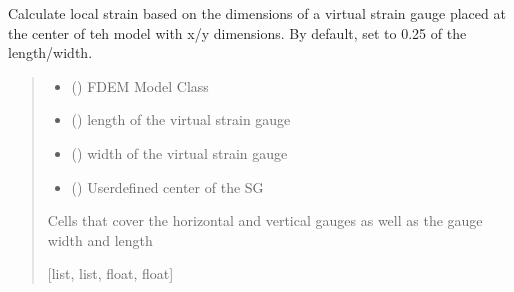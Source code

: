 \documentclass[letterpaper,10pt,english]{sphinxmanual}
\begin{document}
\begin{fulllineitems}
\label{\detokenize{pyfdempp:pyfdempp.complete_UCS_thread_pool_generators.set_strain_gauge}}
\pysigstartsignatures
{}
\pysigstopsignatures
\sphinxAtStartPar
Calculate local strain based on the dimensions of a virtual strain gauge placed at the center of teh model with
x/y dimensions. By default, set to 0.25 of the length/width.
\begin{quote}\begin{description}
\begin{itemize}
\item {} 
\sphinxAtStartPar
{} () \textendash{} FDEM Model Class

\item {} 
\sphinxAtStartPar
{} () \textendash{} length of the virtual strain gauge

\item {} 
\sphinxAtStartPar
{} () \textendash{} width of the virtual strain gauge

\item {} 
\sphinxAtStartPar
{} (\sphinxstyleliteralemphasis{\sphinxupquote{{[}}}\sphinxstyleliteralemphasis{\sphinxupquote{, }}\sphinxstyleliteralemphasis{\sphinxupquote{, }}\sphinxstyleliteralemphasis{\sphinxupquote{{]}}}) \textendash{} User\sphinxhyphen{}defined center of the SG

\end{itemize}

\sphinxAtStartPar
Cells that cover the horizontal and vertical gauges as well as the gauge width and length

\sphinxAtStartPar
{[}list, list, float, float{]}

\end{description}\end{quote}

\end{fulllineitems}
\end{document}
